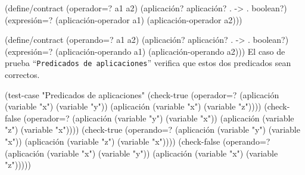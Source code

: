 \documentclass[10pt,oneside,openany,letterpaper]{book}
\begin{document}
\nwenddocs{}\endmoddef
(define/contract (operador=? a1 a2)
  (aplicación? aplicación? . -> . boolean?)
  (expresión=? (aplicación-operador a1)
               (aplicación-operador a2)))

(define/contract (operando=? a1 a2)
  (aplicación? aplicación? . -> . boolean?)
  (expresión=? (aplicación-operando a1)
               (aplicación-operando a2)))
\eatline
{}\nwendcode{}\nwdocspar
El caso de prueba ``{\tt{}Predicados\ de\ aplicaciones}'' verifica que estos dos predicados sean correctos.

\nwenddocs{}\plusendmoddef
(test-case "Predicados de aplicaciones"
  (check-true (operador=? (aplicación (variable "x") (variable "y"))
                          (aplicación (variable "x") (variable "z"))))
  (check-false (operador=? (aplicación (variable "y") (variable "x"))
                           (aplicación (variable "z") (variable "x"))))
  (check-true (operando=? (aplicación (variable "y") (variable "x"))
                          (aplicación (variable "z") (variable "x"))))
  (check-false (operando=? (aplicación (variable "x") (variable "y"))
                           (aplicación (variable "x") (variable "z")))))
\nwendcode{}\nwdocspar
\end{document}

